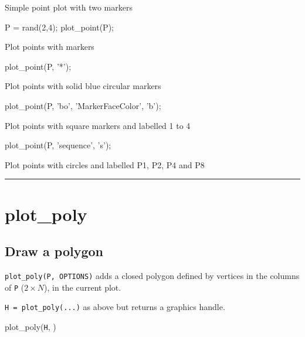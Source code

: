Simple point plot with two markers

\begin{Code}
  P = rand(2,4);
  plot_point(P);

\end{Code}


Plot points with markers

\begin{Code}
  plot_point(P, '*');

\end{Code}


Plot points with solid blue circular markers

\begin{Code}
  plot_point(P, 'bo', 'MarkerFaceColor', 'b');

\end{Code}


Plot points with square markers and labelled 1 to 4

\begin{Code}
  plot_point(P, 'sequence', 's');

\end{Code}


Plot points with circles and labelled P1, P2, P4 and P8

\vspace{1.5ex}\rule{\textwidth}{1mm}

\hypertarget{plot\_poly}{\section*{plot\_poly}}
\subsection*{Draw a polygon}


\texttt{plot\_poly(P, OPTIONS)} adds a closed polygon defined by vertices in the columns
of \texttt{P} ($2 \times N$), in the current plot.



\texttt{H = plot\_poly(...)} as above but returns a graphics handle.



plot\_poly(\texttt{H}, )


